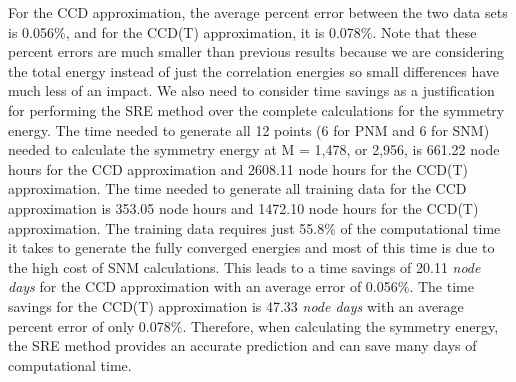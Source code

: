 For the CCD approximation, the average percent error between the two data sets is 0.056$\%$, and for the CCD(T) approximation, it is 0.078$\%$. Note that these percent errors are much smaller than previous results because we are considering the total energy instead of just the correlation energies so small differences have much less of an impact. We also need to consider time savings as a justification for performing the SRE method over the complete calculations for the symmetry energy. The time needed to generate all 12 points (6 for PNM and 6 for SNM) needed to calculate the symmetry energy at M = 1,478, or 2,956, is 661.22 node hours for the CCD approximation and 2608.11 node hours for the CCD(T) approximation. The time needed to generate all training data for the CCD approximation is 353.05 node hours and 1472.10 node hours for the CCD(T) approximation. The training data requires just 55.8$\%$ of the computational time it takes to generate the fully converged energies and most of this time is due to the high cost of SNM calculations. This leads to a time savings of 20.11 \textit{node days} for the CCD approximation with an average error of 0.056$\%$. The time savings for the CCD(T) approximation is 47.33 \textit{node days} with an average percent error of only 0.078$\%$. Therefore, when calculating the symmetry energy, the SRE method provides an accurate prediction and can save many days of computational time.
